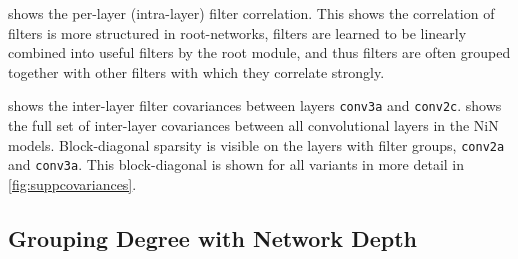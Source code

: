 \documentclass[thesis]{subfiles}
\begin{document}
	 shows the per-layer (intra-layer) filter correlation. This shows the correlation of filters is more structured in root-networks, filters are learned to be linearly combined into useful filters by the root module, and thus filters are often grouped together with other filters with which they correlate strongly.
	
	 shows the inter-layer filter covariances between layers \texttt{conv3a} and \texttt{conv2c}.  shows the full set of inter-layer covariances between all convolutional layers in the NiN models. Block-diagonal sparsity is visible on the layers with filter groups, \texttt{conv2a} and \texttt{conv3a}. This block-diagonal is shown for all variants in more detail in \cref{fig:suppcovariances}.
	
	\subsection{Grouping Degree with Network Depth}
\end{document}
